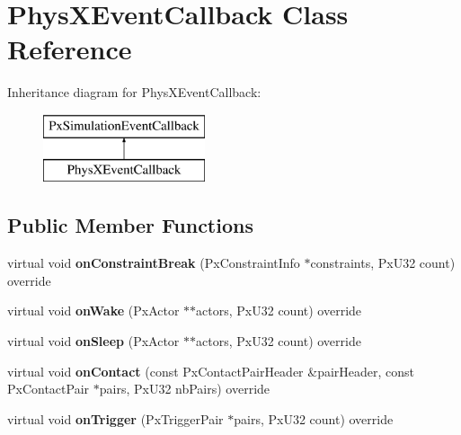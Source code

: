 \hypertarget{class_phys_x_event_callback}{}\section{Phys\+X\+Event\+Callback Class Reference}
\label{class_phys_x_event_callback}
Inheritance diagram for Phys\+X\+Event\+Callback\+:\begin{figure}[H]
\begin{center}
\leavevmode
\includegraphics[height=2.000000cm]{class_phys_x_event_callback}
\end{center}
\end{figure}
\subsection*{Public Member Functions}
\begin{DoxyCompactItemize}
\item 
\hypertarget{class_phys_x_event_callback_ae8880546913e485700ce2ee1f7f6f55e}{}virtual void {\bfseries on\+Constraint\+Break} (Px\+Constraint\+Info $\ast$constraints, Px\+U32 count) override\label{class_phys_x_event_callback_ae8880546913e485700ce2ee1f7f6f55e}

\item 
\hypertarget{class_phys_x_event_callback_a630f09dcb2536172a413263765b3c43d}{}virtual void {\bfseries on\+Wake} (Px\+Actor $\ast$$\ast$actors, Px\+U32 count) override\label{class_phys_x_event_callback_a630f09dcb2536172a413263765b3c43d}

\item 
\hypertarget{class_phys_x_event_callback_aafe0aed55517f6a0a0e96b5aba413c4e}{}virtual void {\bfseries on\+Sleep} (Px\+Actor $\ast$$\ast$actors, Px\+U32 count) override\label{class_phys_x_event_callback_aafe0aed55517f6a0a0e96b5aba413c4e}

\item 
\hypertarget{class_phys_x_event_callback_a70b68c082b19901f260799ed5292d1ec}{}virtual void {\bfseries on\+Contact} (const Px\+Contact\+Pair\+Header \&pair\+Header, const Px\+Contact\+Pair $\ast$pairs, Px\+U32 nb\+Pairs) override\label{class_phys_x_event_callback_a70b68c082b19901f260799ed5292d1ec}

\item 
\hypertarget{class_phys_x_event_callback_a513a33261a63b4bb5141766219a5c876}{}virtual void {\bfseries on\+Trigger} (Px\+Trigger\+Pair $\ast$pairs, Px\+U32 count) override\label{class_phys_x_event_callback_a513a33261a63b4bb5141766219a5c876}

\end{DoxyCompactItemize}


